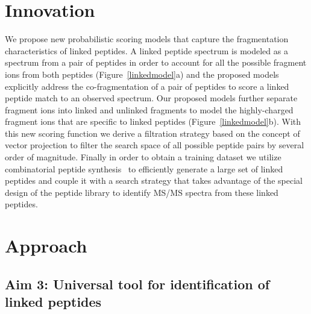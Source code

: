 \documentclass[arial,11pt]{article}
\begin{document}

\section{Innovation}
We propose new probabilistic scoring models that capture the fragmentation characteristics of linked peptides.  A linked peptide spectrum is modeled as a spectrum from a pair of peptides in order to account for all the possible fragment ions from both peptides (Figure~\ref{linkedmodel}a) and the proposed models explicitly address the co-fragmentation of a pair of peptides to score a linked peptide match to an observed spectrum.  
Our proposed models further separate fragment ions into linked and unlinked fragments to model the highly-charged fragment ions that are specific to linked peptides (Figure~\ref{linkedmodel}b).  With this new scoring function we derive a filtration strategy based on the concept of vector projection to filter the search space of all possible peptide pairs by several order of magnitude.  Finally in order to obtain a training dataset we utilize combinatorial peptide synthesis~\cite{houghten1991generation} to efficiently generate a large set of linked peptides and couple it with a search strategy that takes advantage of the special design of the peptide library to identify MS/MS spectra from these linked peptides.


\section{Approach}
\subsection{Aim 3: Universal tool for identification of linked peptides}

\end{document}
